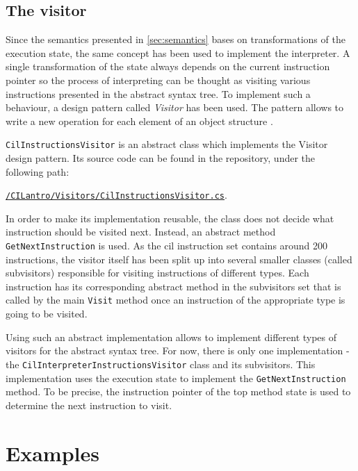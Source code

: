 \documentclass[declaration,shortabstract,english,mgr]{iithesis}
\begin{document}
\subsection{The visitor}
\label{sec:visitor}

Since the semantics presented in \ref{sec:semantics} bases on transformations of the execution state, the same concept has been used to implement the interpreter. A single transformation of the state always depends on the current instruction pointer so the process of interpreting can be thought as visiting various instructions presented in the abstract syntax tree. To implement such a behaviour, a design pattern called \textit{Visitor} has been used. The pattern allows to write a new operation for each element of an object structure \cite{designPatterns}.

\texttt{CilInstructionsVisitor} is an abstract class which implements the Visitor design pattern. Its source code can be found in the repository, under the following path:
\begin{center}
\href{https://github.com/kvasnyk/CILantro/blob/master/CILantro/CILantro/Visitors/CilInstructionsVisitor.cs}{\texttt{/CILantro/Visitors/CilInstructionsVisitor.cs}}.
\end{center}
In order to make its implementation reusable, the class does not decide what instruction should be visited next. Instead, an abstract method \texttt{GetNextInstruction} is used. As the \acrshort{cil} instruction set contains around 200 instructions, the visitor itself has been split up into several smaller classes (called subvisitors) responsible for visiting instructions of different types. Each instruction has its corresponding abstract method in the subvisitors set that is called by the main \texttt{Visit} method once an instruction of the appropriate type is going to be visited.

Using such an abstract implementation allows to implement different types of visitors for the abstract syntax tree. For now, there is only one implementation - the \texttt{CilInterpreterInstructionsVisitor} class and its subvisitors. This implementation uses the execution state to implement the \texttt{GetNextInstruction} method. To be precise, the instruction pointer of the top method state is used to determine the next instruction to visit.

\section{Examples}
\end{document}

